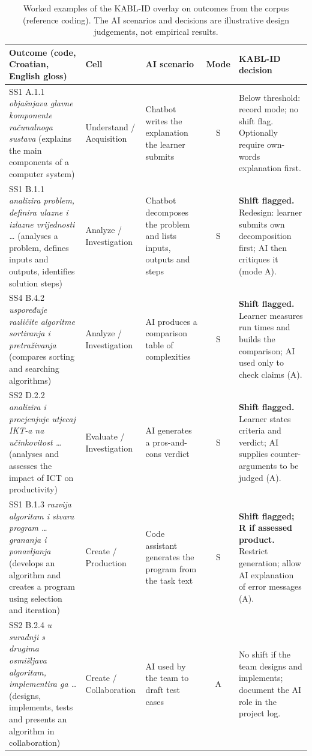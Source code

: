 \documentclass[journal,article,submit,pdftex,moreauthors]{Definitions/mdpi}
\begin{document}
\begin{table}[H]
\caption{Worked examples of the KABL-ID overlay on outcomes from the corpus (reference coding). The AI scenarios and decisions are illustrative design judgements, not empirical results.}
\label{tab:overlay}
\centering
\scriptsize
\setlength{\tabcolsep}{2.5pt}
\begin{tabularx}{\linewidth}{p{3.4cm}p{1.6cm}>{\raggedright\arraybackslash}p{3.2cm}c>{\raggedright\arraybackslash}X}
\toprule
\textbf{Outcome (code, Croatian, English gloss)} & \textbf{Cell} & \textbf{AI scenario} & \textbf{Mode} & \textbf{KABL-ID decision} \\
\midrule
SS1 A.1.1 \emph{objašnjava glavne komponente računalnoga sustava} (explains the main components of a computer system) & Understand / Acquisition & Chatbot writes the explanation the learner submits & S & Below threshold: record mode; no shift flag. Optionally require own-words explanation first. \\
\midrule
SS1 B.1.1 \emph{analizira problem, definira ulazne i izlazne vrijednosti \ldots} (analyses a problem, defines inputs and outputs, identifies solution steps) & Analyze / Investigation & Chatbot decomposes the problem and lists inputs, outputs and steps & S & \textbf{Shift flagged.} Redesign: learner submits own decomposition first; AI then critiques it (mode A). \\
\midrule
SS4 B.4.2 \emph{uspoređuje različite algoritme sortiranja i pretraživanja} (compares sorting and searching algorithms) & Analyze / Investigation & AI produces a comparison table of complexities & S & \textbf{Shift flagged.} Learner measures run times and builds the comparison; AI used only to check claims (A). \\
\midrule
SS2 D.2.2 \emph{analizira i procjenjuje utjecaj IKT-a na učinkovitost \ldots} (analyses and assesses the impact of ICT on productivity) & Evaluate / Investigation & AI generates a pros-and-cons verdict & S & \textbf{Shift flagged.} Learner states criteria and verdict; AI supplies counter-arguments to be judged (A). \\
\midrule
SS1 B.1.3 \emph{razvija algoritam i stvara program \ldots{} grananja i ponavljanja} (develops an algorithm and creates a program using selection and iteration) & Create / Production & Code assistant generates the program from the task text & S & \textbf{Shift flagged; R if assessed product.} Restrict generation; allow AI explanation of error messages (A). \\
\midrule
SS2 B.2.4 \emph{u suradnji s drugima osmišljava algoritam, implementira ga \ldots} (designs, implements, tests and presents an algorithm in collaboration) & Create / Collaboration & AI used by the team to draft test cases & A & No shift if the team designs and implements; document the AI role in the project log. \\
\bottomrule
\end{tabularx}
\end{table}
\end{document}
